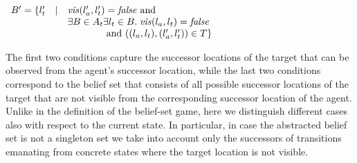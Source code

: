 \begin{itemize}
\begin{itemize}
$\begin{array}{lll}
B' = \{l_t' & \mid & \mathit{vis}(l_a',l_t') = \mathit{false} \text{ and }\\
&&\exists B \in A_t \exists l_t \in B.\; \mathit{vis}(l_a,l_t) = \mathit{false}\\ 
&&\phantom{\exists B \in A_t } \text{ and } ((l_a,l_t),(l_a',l_t')) \in T
\}
\end{array}
$
\end{itemize}
The first two conditions capture the successor locations of the target that can be observed from the agent's successor location, while the last two conditions  correspond to the belief set that consists of all possible successor locations of the target that are not visible from the corresponding successor location of the agent. Unlike in the definition of the belief-set game, here we distinguish different cases also with respect to the current state. In particular, in case the abstracted belief set is not a singleton set we take into account only the successors of transitions emanating from concrete states where the target location is not visible.

\end{itemize}


\begin{example}
\end{example}

